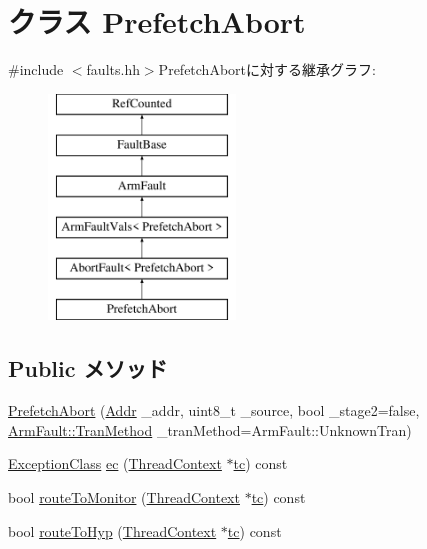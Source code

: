\hypertarget{classArmISA_1_1PrefetchAbort}{
\section{クラス PrefetchAbort}
\label{classArmISA_1_1PrefetchAbort}
}


{\ttfamily \#include $<$faults.hh$>$}PrefetchAbortに対する継承グラフ:\begin{figure}[H]
\begin{center}
\leavevmode
\includegraphics[height=6cm]{classArmISA_1_1PrefetchAbort}
\end{center}
\end{figure}
\subsection*{Public メソッド}
\begin{DoxyCompactItemize}
\item 
\hyperlink{classArmISA_1_1PrefetchAbort_adbe1805a5aad9380631cc0402ae0667e}{PrefetchAbort} (\hyperlink{classm5_1_1params_1_1Addr}{Addr} \_\-addr, uint8\_\-t \_\-source, bool \_\-stage2=false, \hyperlink{classArmISA_1_1ArmFault_ad78237d6390becbe8bdf9e73979c56ae}{ArmFault::TranMethod} \_\-tranMethod=ArmFault::UnknownTran)
\item 
\hyperlink{namespaceArmISA_a04034d12009cf36227f4d2abff3331a2}{ExceptionClass} \hyperlink{classArmISA_1_1PrefetchAbort_aefab73b22a74d7c48b8a23230906d7cd}{ec} (\hyperlink{classThreadContext}{ThreadContext} $\ast$\hyperlink{namespaceArmISA_a5aff829af55e65b802d83dfcef4e9dd0}{tc}) const 
\item 
bool \hyperlink{classArmISA_1_1PrefetchAbort_afd7a21fdb010230ad53094254739dde8}{routeToMonitor} (\hyperlink{classThreadContext}{ThreadContext} $\ast$\hyperlink{namespaceArmISA_a5aff829af55e65b802d83dfcef4e9dd0}{tc}) const 
\item 
bool \hyperlink{classArmISA_1_1PrefetchAbort_a16facd13ba8e6d15d2b865882c379d5f}{routeToHyp} (\hyperlink{classThreadContext}{ThreadContext} $\ast$\hyperlink{namespaceArmISA_a5aff829af55e65b802d83dfcef4e9dd0}{tc}) const 
\end{DoxyCompactItemize}
